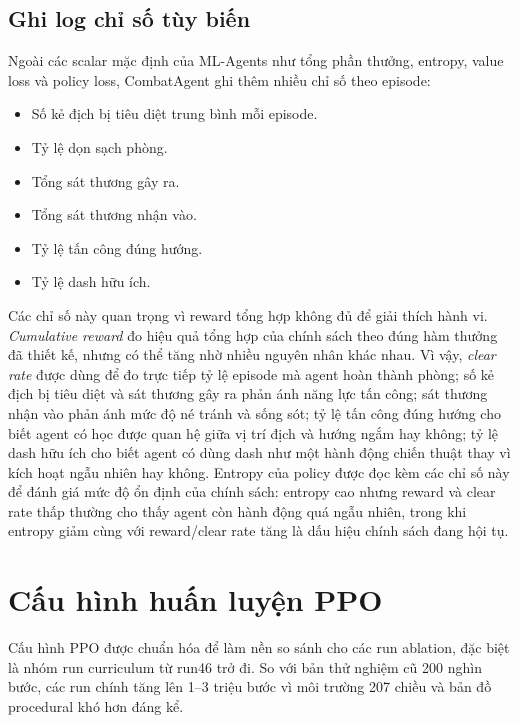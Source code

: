 \subsection{Ghi log chỉ số tùy biến}

Ngoài các scalar mặc định của ML-Agents như tổng phần thưởng, entropy, value loss và policy loss, CombatAgent ghi thêm nhiều chỉ số theo episode:

\begin{itemize}
    \item Số kẻ địch bị tiêu diệt trung bình mỗi episode.
    \item Tỷ lệ dọn sạch phòng.
    \item Tổng sát thương gây ra.
    \item Tổng sát thương nhận vào.
    \item Tỷ lệ tấn công đúng hướng.
    \item Tỷ lệ dash hữu ích.
\end{itemize}

Các chỉ số này quan trọng vì reward tổng hợp không đủ để giải thích hành vi. \textit{Cumulative reward} đo hiệu quả tổng hợp của chính sách theo đúng hàm thưởng đã thiết kế, nhưng có thể tăng nhờ nhiều nguyên nhân khác nhau. Vì vậy, \textit{clear rate} được dùng để đo trực tiếp tỷ lệ episode mà agent hoàn thành phòng; số kẻ địch bị tiêu diệt và sát thương gây ra phản ánh năng lực tấn công; sát thương nhận vào phản ánh mức độ né tránh và sống sót; tỷ lệ tấn công đúng hướng cho biết agent có học được quan hệ giữa vị trí địch và hướng ngắm hay không; tỷ lệ dash hữu ích cho biết agent có dùng dash như một hành động chiến thuật thay vì kích hoạt ngẫu nhiên hay không. Entropy của policy được đọc kèm các chỉ số này để đánh giá mức độ ổn định của chính sách: entropy cao nhưng reward và clear rate thấp thường cho thấy agent còn hành động quá ngẫu nhiên, trong khi entropy giảm cùng với reward/clear rate tăng là dấu hiệu chính sách đang hội tụ.

\section{Cấu hình huấn luyện PPO}

Cấu hình PPO được chuẩn hóa để làm nền so sánh cho các run ablation, đặc biệt là nhóm run curriculum từ run46 trở đi. So với bản thử nghiệm cũ 200 nghìn bước, các run chính tăng lên 1--3 triệu bước vì môi trường 207 chiều và bản đồ procedural khó hơn đáng kể.

